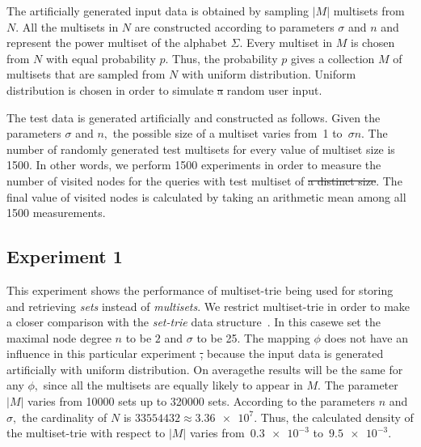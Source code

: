 \documentclass[10pt,letterpaper]{article}
\providecommand{\DIFaddtex}[1]{{\protect\color{blue}\uwave{#1}}} %
\providecommand{\DIFdeltex}[1]{{\protect\color{red}\sout{#1}}}                      %
\providecommand{\DIFaddbegin}{} %
\providecommand{\DIFaddend}{} %
\providecommand{\DIFdelbegin}{} %
\providecommand{\DIFdelend}{} %
\providecommand{\DIFadd}[1]{\texorpdfstring{\DIFaddtex{#1}}{#1}} %
\providecommand{\DIFdel}[1]{\texorpdfstring{\DIFdeltex{#1}}{}} %
\newcommand{\DIFscaledelfig}{0.5}
\newlength{\DIFdelgraphicswidth} %
\newlength{\DIFdelgraphicsheight} %
\newcommand{\DIFaddincludegraphics}[2][]{{\color{blue}\fbox{\DIFOincludegraphics[#1]{#2}}}} %
\newcommand{\DIFdelincludegraphics}[2][]{%
\sbox{\DIFdelgraphicsbox}{\DIFOincludegraphics[#1]{#2}}%
\settoboxwidth{\DIFdelgraphicswidth}{\DIFdelgraphicsbox} %
\settoboxtotalheight{\DIFdelgraphicsheight}{\DIFdelgraphicsbox} %
\scalebox{\DIFscaledelfig}{%
\parbox[b]{\DIFdelgraphicswidth}{\usebox{\DIFdelgraphicsbox}\\[-\baselineskip] \rule{\DIFdelgraphicswidth}{0em}}\llap{\resizebox{\DIFdelgraphicswidth}{\DIFdelgraphicsheight}{%
\setlength{\unitlength}{\DIFdelgraphicswidth}%
\begin{picture}(1,1)%
\thicklines\linethickness{2pt} %
{\color[rgb]{1,0,0}\put(0,0){\framebox(1,1){}}}%
{\color[rgb]{1,0,0}\put(0,0){\line( 1,1){1}}}%
{\color[rgb]{1,0,0}\put(0,1){\line(1,-1){1}}}%
\end{picture}%
}\hspace*{3pt}}} %
} %
\DeclareRobustCommand{\DIFaddbegin}{\DIFOaddbegin \let\includegraphics\DIFaddincludegraphics} %
\DeclareRobustCommand{\DIFaddend}{\DIFOaddend \let\includegraphics\DIFOincludegraphics} %
\DeclareRobustCommand{\DIFdelbegin}{\DIFOdelbegin \let\includegraphics\DIFdelincludegraphics} %
\DeclareRobustCommand{\DIFdelend}{\DIFOaddend \let\includegraphics\DIFOincludegraphics} %
\begin{document}
The artificially generated input data is obtained by sampling $|M|$ multisets 
from $N.$ All the multisets in $N$ are constructed according to parameters 
$\sigma$ and $n$ and represent the power multiset of the alphabet $\Sigma.$ 
Every multiset in $M$ is chosen from $N$ with equal probability $p.$ Thus, the 
probability $p$ gives a collection $M$ of multisets that are sampled from $N$ 
with uniform distribution. Uniform distribution is chosen in order to simulate
\DIFdelbegin \DIFdel{a 
}\DIFdelend random user input.

The test data is generated artificially and constructed as follows. Given the 
parameters $\sigma$ and $n,$ the possible size of a multiset varies from~1 
to~$\sigma n.$ The number of randomly generated test multisets for every 
value of multiset size is 1500. In other words, we perform 1500 experiments 
in order to measure the number of visited nodes for the queries with \DIFaddbegin \DIFadd{a }\DIFaddend test multiset 
of \DIFdelbegin \DIFdel{a distinct size}\DIFdelend \DIFaddbegin \DIFadd{distinct sizes}\DIFaddend . The final value of visited nodes is calculated by taking an 
arithmetic mean among all 1500 measurements.


\subsection{Experiment 1} \label{s:exp1}
This experiment shows the performance of multiset-trie being used for storing 
and retrieving \emph{sets} instead of \emph{multisets}. We restrict multiset-trie in order 
to make a closer comparison with the \emph{set-trie} data structure~\cite{savnik2013index}.
In this case\DIFaddbegin \DIFadd{, }\DIFaddend we set the maximal node degree $n$ to be $2$ and $\sigma$ to be 25. 
The mapping $\phi$ does not have an influence in this particular experiment
\DIFdelbegin \DIFdel{, 
}\DIFdelend because the input data is generated artificially with uniform distribution. On 
average\DIFaddbegin \DIFadd{, }\DIFaddend the results will be the same for any $\phi,$ since all the multisets are 
equally likely to appear in $M.$ The parameter $|M|$ varies from 10000 sets up 
to 320000 sets. According to the parameters $n$ and $\sigma,$ the cardinality of 
$N$ is $33554432\approx \num{3.36e+7}.$ Thus, the calculated density of the 
multiset-trie with respect to $|M|$ varies from~$\num{0.3e-3}$ to~$\num{9.5e-3}.$
\end{document}
